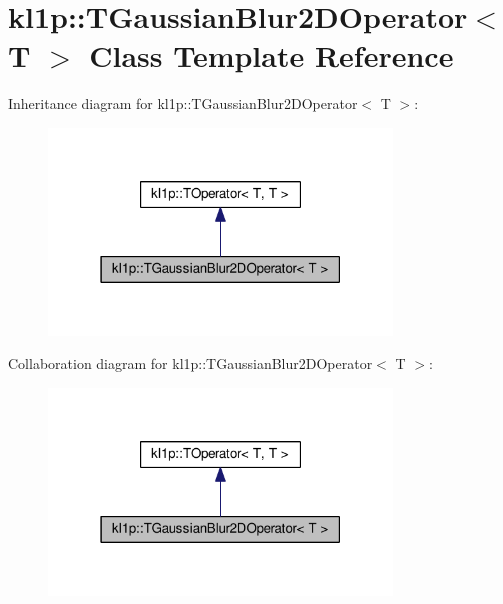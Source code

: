\hypertarget{classkl1p_1_1TGaussianBlur2DOperator}{}\section{kl1p\+:\+:T\+Gaussian\+Blur2\+D\+Operator$<$ T $>$ Class Template Reference}
\label{classkl1p_1_1TGaussianBlur2DOperator}


Inheritance diagram for kl1p\+:\+:T\+Gaussian\+Blur2\+D\+Operator$<$ T $>$\+:
\nopagebreak
\begin{figure}[H]
\begin{center}
\leavevmode
\includegraphics[width=259pt]{classkl1p_1_1TGaussianBlur2DOperator__inherit__graph}
\end{center}
\end{figure}


Collaboration diagram for kl1p\+:\+:T\+Gaussian\+Blur2\+D\+Operator$<$ T $>$\+:
\nopagebreak
\begin{figure}[H]
\begin{center}
\leavevmode
\includegraphics[width=259pt]{classkl1p_1_1TGaussianBlur2DOperator__coll__graph}
\end{center}
\end{figure}

